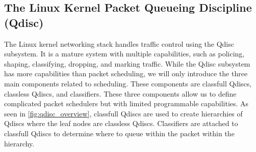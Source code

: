 \documentclass[sigconf, nonacm]{acmart}
\begin{document}


\subsection{The Linux Kernel Packet Queueing Discipline (Qdisc)}


The Linux kernel networking stack handles traffic control using the Qdisc subsystem. It is a mature system with multiple capabilities, such as policing, shaping, classifying, dropping, and marking traffic. While the Qdisc subsystem has more capabilities than packet scheduling, we will only introduce the three main components related to scheduling. These components are classfull Qdiscs, classless Qdiscs, and classifiers. These three components allow us to define complicated packet schedulers but with limited programmable capabilities. As seen in \cref{fig:qdisc_overview}, classfull Qdiscs are used to create hierarchies of Qdiscs where the leaf nodes are classless Qdiscs. Classifiers are attached to classfull Qdiscs to determine where to queue within the packet within the hierarchy.


%
%
\end{document}
